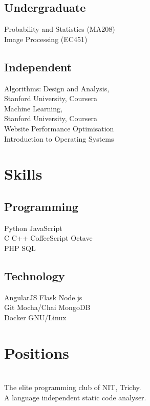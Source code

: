 \documentclass[]{deedy-resume-openfont}
\begin{document}
\begin{minipage}[t]{0.33\textwidth}
\subsection{Undergraduate}
\textbullet{} Probability and Statistics (MA208)\\
\textbullet{} Image Processing (EC451)
\sectionsep
\subsection{Independent}
\textbullet{} Algorithms: Design and Analysis,\\ Stanford University,  Coursera\\
\textbullet{} Machine Learning, \\Stanford University, Coursera\\
\textbullet{} Website Performance Optimisation \\
\textbullet{} Introduction to Operating Systems
\sectionsep


\section{Skills}
\subsection{Programming}
\textbullet{} Python \textbullet{} JavaScript \\
\textbullet{} C \textbullet{} C++ \textbullet{} CoffeeScript \textbullet{} Octave \\
\textbullet{} PHP  \textbullet{} SQL \\
\subsection{Technology}
\textbullet{} AngularJS \textbullet{} Flask \textbullet{} Node.js \\ \textbullet{} Git \textbullet{} Mocha/Chai \textbullet{} MongoDB \\
\textbullet{} Docker \textbullet{} GNU/Linux
\sectionsep

\section{Positions} 
{}\\ 
The elite programming club of NIT, Trichy.
{}\\ 
A language independent static code analyser.
\sectionsep



\end{minipage}
\end{document}
